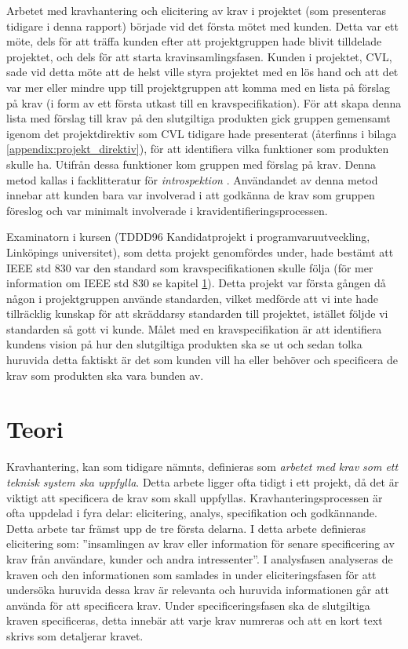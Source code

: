 Arbetet med kravhantering och elicitering av krav i projektet (som presenteras tidigare i denna rapport) började vid det första mötet med kunden. Detta var ett möte, dels för att träffa kunden efter att projektgruppen hade blivit tilldelade projektet, och dels för att starta kravinsamlingsfasen. Kunden i projektet, CVL, sade vid detta möte att de helst ville styra projektet med en lös hand och att det var mer eller mindre upp till projektgruppen att komma med en lista på förslag på krav (i form av ett första utkast till en kravspecifikation). För att skapa denna lista med förslag till krav på den slutgiltiga produkten gick gruppen gemensamt igenom det projektdirektiv som CVL tidigare hade presenterat (återfinns i bilaga \ref{appendix:projekt_direktiv}), för att identifiera vilka funktioner som produkten skulle ha. Utifrån dessa funktioner kom gruppen med förslag på krav. Denna metod kallas i facklitteratur för \textit{introspektion} \cite{goguen1993techniques}. Användandet av denna metod innebar att kunden bara var involverad i att godkänna de krav som gruppen föreslog och var minimalt involverade i kravidentifieringsprocessen. 

Examinatorn i kursen (TDDD96 Kandidatprojekt i programvaruutveckling, Linköpings universitet), som detta projekt genomfördes under, hade bestämt att IEEE std 830 var den standard som kravspecifikationen skulle följa (för mer information om IEEE std 830 se kapitel \ref{sec:theory-jannering}). Detta projekt var första gången då någon i projektgruppen använde standarden, vilket medförde att vi inte hade tillräcklig kunskap för att skräddarsy standarden till projektet, istället följde vi standarden så gott vi kunde. Målet med en kravspecifikation är att identifiera kundens vision på hur den slutgiltiga produkten ska se ut och sedan tolka huruvida detta faktiskt är det som kunden vill ha eller behöver och specificera de krav som produkten ska vara bunden av. 


\section{Teori}
\label{sec:theory-jannering}
Kravhantering, kan som tidigare nämnts, definieras som \textit{arbetet med krav som ett teknisk system ska uppfylla}. Detta arbete ligger ofta tidigt i ett projekt, då det är viktigt att specificera de krav som skall uppfyllas. Kravhanteringsprocessen är ofta uppdelad i fyra delar: elicitering, analys, specifikation och godkännande. Detta arbete tar främst upp de tre första delarna. I detta arbete definieras elicitering som: ”insamlingen av krav eller information för senare specificering av krav från användare, kunder och andra intressenter”. I analysfasen analyseras de kraven och den informationen som samlades in under eliciteringsfasen för att undersöka huruvida dessa krav är relevanta och huruvida informationen går att använda för att specificera krav. Under specificeringsfasen ska de slutgiltiga kraven specificeras, detta innebär att varje krav numreras och att en kort text skrivs som detaljerar kravet.
